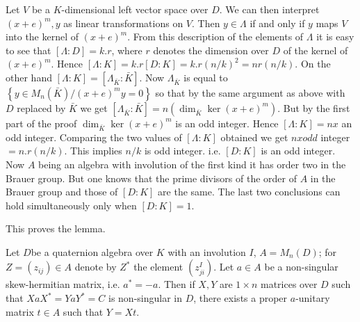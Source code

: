 Let $V$ be a $K$-dimensional left vector space over $D$. We can then
interpret $(x+e)^m, y$ as linear transformations on $V$. Then $y \in
\Lambda $ if and only if $y$ maps $V$ into the kernel of
$(x+e)^{m}$. From this description of the elements of $\Lambda $ it is
easy to see that $[ \Lambda  :D]=k.r$, where $r$ denotes the dimension
over $D$ of the kernel of $(x+e)^m$.  Hence $[ \Lambda  :K]=k.r
[D:K]=k.r(n/k)^2=nr (n/k)$. On the other hand
$[\Lambda :K]=[\Lambda_{\bar{K}} : \bar{K}]$. Now $\Lambda_{\bar{K}}$ is equal to
$\left\{y \in M_n (\bar{K})/(x+e)^m y=0 \right\}$ so that by the same
argument as 
above with $D$ replaced by $\bar{K}$ we  get $ [\Lambda_{\bar{K}}:
  \bar{K}]=n (\dim_{\bar{K}} \ker (x+e)^m)$. But by the first part of
the proof $\dim_{\bar{K}} \ker (x+e)^m$  is an odd integer. Hence
$[\Lambda : K]=n x$ an odd integer. Comparing the two values of
$[\Lambda :K]$ obtained we get $nx odd$ integer $=n.r(n/k)$. This
implies $n/k$ is odd integer. i.e. $[D:K]$ is an odd integer. Now $A$
being an algebra  with involution of the first kind it has order two
in the Brauer group. But one knows that the prime divisors of the
order of $A$ in the Brauer group and those of $[D:K]$ are the same. 
The last two conclusions can hold simultaneously only when $[D:K]=1$.

This proves the lemma.

\begin{lem}\label{chap2:lem2}
Let $D$\pageoriginale be a quaternion algebra over $K$ with an involution
$I$, $A=M_n(D)$; for $Z= (z_{ij}) \in A$ denote by $Z^*$ the element 
$(z_{ji}^I)$. Let $a \in A $ be a non-singular skew-hermitian matrix,
i.e. $a^*=-a$. Then if $X,Y$ are $1 \times n$ matrices over $D$ such
that $XaX^* = YaY^*=C$ is non-singular in $D$, there exists a proper
$a$-unitary matrix $t \in A$ such that $Y=Xt$. 
\end{lem}

